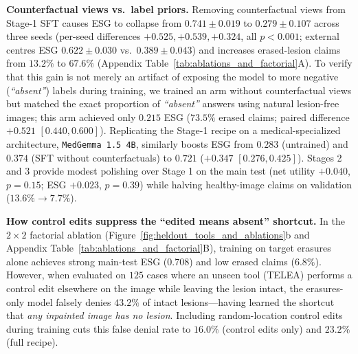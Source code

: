 \documentclass[5p,times,twocolumn,authoryear]{elsarticle}
\begin{document}
\textbf{Counterfactual views vs.\ label priors.} Removing counterfactual views from Stage-1 SFT causes ESG to collapse from $0.741 \pm 0.019$ to $0.279 \pm 0.107$ across three seeds (per-seed differences $+0.525, +0.539, +0.324$, all $p < 0.001$; external centres ESG $0.622 \pm 0.030$ vs.\ $0.389 \pm 0.043$) and increases erased-lesion claims from $13.2\%$ to $67.6\%$ (Appendix Table~\ref{tab:ablations_and_factorial}A). To verify that this gain is not merely an artifact of exposing the model to more negative (\emph{``absent''}) labels during training, we trained an arm without counterfactual views but matched the exact proportion of \emph{``absent''} answers using natural lesion-free images; this arm achieved only $0.215$ ESG ($73.5\%$ erased claims; paired difference $+0.521$ $[0.440, 0.600]$). Replicating the Stage-1 recipe on a medical-specialized architecture, \texttt{MedGemma 1.5 4B}, similarly boosts ESG from $0.283$ (untrained) and $0.374$ (SFT without counterfactuals) to $0.721$ ($+0.347$ $[0.276, 0.425]$). Stages 2 and 3 provide modest polishing over Stage 1 on the main test (net utility $+0.040$, $p = 0.15$; ESG $+0.023$, $p = 0.39$) while halving healthy-image claims on validation ($13.6\% \to 7.7\%$).

\textbf{How control edits suppress the ``edited means absent'' shortcut.} In the $2\times 2$ factorial ablation (Figure~\ref{fig:heldout_tools_and_ablations}b and Appendix Table~\ref{tab:ablations_and_factorial}B), training on target erasures alone achieves strong main-test ESG ($0.708$) and low erased claims ($6.8\%$). However, when evaluated on $125$ cases where an unseen tool (TELEA) performs a control edit elsewhere on the image while leaving the lesion intact, the erasures-only model falsely denies $43.2\%$ of intact lesions---having learned the shortcut that \emph{any inpainted image has no lesion}. Including random-location control edits during training cuts this false denial rate to $16.0\%$ (control edits only) and $23.2\%$ (full recipe).
\end{document}
